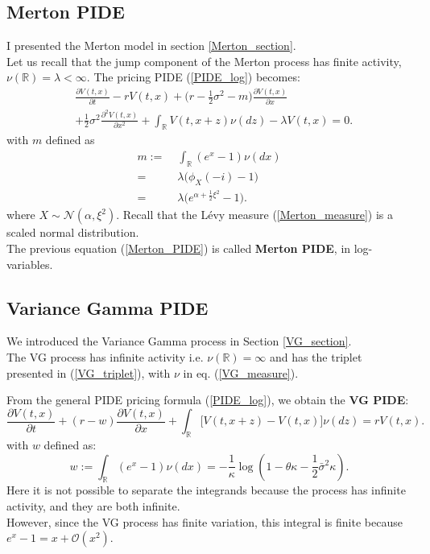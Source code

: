 \documentclass[a4paper,10pt]{article}
\newcommand{\numberset}{\mathbb}
\newcommand{\R}{\numberset{R}}
\begin{document}
\subsection{Merton PIDE}

I presented the Merton model in section \ref{Merton_section}.\\
Let us recall that the jump component of the Merton process has finite activity, $\nu(\R) = \lambda < \infty$.
The pricing PIDE (\ref{PIDE_log}) becomes: 
\begin{align}\label{Merton_PIDE}
&  \frac{\partial V(t,x)}{\partial t} - r V(t,x) 
          + \biggl( r -\frac{1}{2}\sigma^2 -m \biggr) \frac{\partial V(t,x)}{\partial x} \\ \nonumber
          &+ \frac{1}{2} \sigma^2 \frac{\partial^2 V(t,x)}{\partial x^2} 
          + \int_{\R} V(t,x+z) \nu(dz) - \lambda V(t,x)  = 0.
\end{align}
with $m$ defined as
\begin{align}\label{parameter_m} 
 m :=& \; \int_{\R} ( e^{x} - 1 ) \nu(dx) \\
    =& \; \lambda \bigl( \phi_X(-i) - 1 \bigr) \\ 
    =& \; \lambda \biggl( e^{\alpha + \frac{1}{2} \xi^2} -1 \biggr).
\end{align}
where $X \sim \mathcal{N}(\alpha, \xi^2)$.
Recall that the Lévy measure (\ref{Merton_measure}) is a scaled normal distribution.\\
The previous equation (\ref{Merton_PIDE}) is called \textbf{Merton PIDE}, in log-variables.


\subsection{Variance Gamma PIDE}


We introduced the Variance Gamma process in Section \ref{VG_section}. \\
The VG process has infinite activity i.e.
$\nu(\R) = \infty$ and has the triplet presented in (\ref{VG_triplet}),
with $\nu$ in eq. (\ref{VG_measure}).
 
From the general PIDE pricing formula (\ref{PIDE_log}), we obtain the \textbf{VG PIDE}:
\begin{equation} \label{VG_PIDE}
 \frac{\partial V(t,x)}{\partial t} + (r-w) \frac{\partial V(t,x)}{\partial x}
 + \int_{\R} \bigl[ V(t,x+z) - V(t,x) \bigr] \nu(dz) = rV(t,x) .
\end{equation}
with $w$ defined as:
\begin{equation}\label{parameter_w}
 w := \int_{\R} (e^x-1) \nu(dx) = - \frac{1}{\kappa} \log \left( 1-\theta \kappa -\frac{1}{2}\bar\sigma^2 \kappa \right).
\end{equation}
Here it is not possible to separate the integrands because the process has infinite activity, and they are both infinite.\\
However, since the VG process has finite variation, this integral is finite because $e^x-1 = x + \mathcal{O}(x^2)$.
\end{document}
